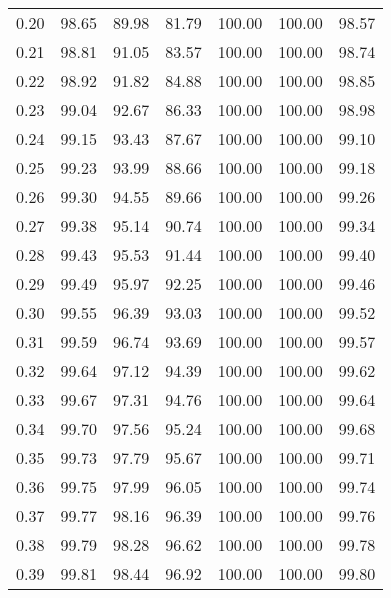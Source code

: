 \begin{tabular}{|c|c|c|c|c|c|c|}
      0.20 &     98.65 &     89.98 &      81.79 &  100.00 &     100.00 &         98.57 \\
      0.21 &     98.81 &     91.05 &      83.57 &  100.00 &     100.00 &         98.74 \\
      0.22 &     98.92 &     91.82 &      84.88 &  100.00 &     100.00 &         98.85 \\
      0.23 &     99.04 &     92.67 &      86.33 &  100.00 &     100.00 &         98.98 \\
      0.24 &     99.15 &     93.43 &      87.67 &  100.00 &     100.00 &         99.10 \\
      0.25 &     99.23 &     93.99 &      88.66 &  100.00 &     100.00 &         99.18 \\
      0.26 &     99.30 &     94.55 &      89.66 &  100.00 &     100.00 &         99.26 \\
      0.27 &     99.38 &     95.14 &      90.74 &  100.00 &     100.00 &         99.34 \\
      0.28 &     99.43 &     95.53 &      91.44 &  100.00 &     100.00 &         99.40 \\
      0.29 &     99.49 &     95.97 &      92.25 &  100.00 &     100.00 &         99.46 \\
      0.30 &     99.55 &     96.39 &      93.03 &  100.00 &     100.00 &         99.52 \\
      0.31 &     99.59 &     96.74 &      93.69 &  100.00 &     100.00 &         99.57 \\
      0.32 &     99.64 &     97.12 &      94.39 &  100.00 &     100.00 &         99.62 \\
      0.33 &     99.67 &     97.31 &      94.76 &  100.00 &     100.00 &         99.64 \\
      0.34 &     99.70 &     97.56 &      95.24 &  100.00 &     100.00 &         99.68 \\
      0.35 &     99.73 &     97.79 &      95.67 &  100.00 &     100.00 &         99.71 \\
      0.36 &     99.75 &     97.99 &      96.05 &  100.00 &     100.00 &         99.74 \\
      0.37 &     99.77 &     98.16 &      96.39 &  100.00 &     100.00 &         99.76 \\
      0.38 &     99.79 &     98.28 &      96.62 &  100.00 &     100.00 &         99.78 \\
      0.39 &     99.81 &     98.44 &      96.92 &  100.00 &     100.00 &         99.80 \\

\end{tabular}
